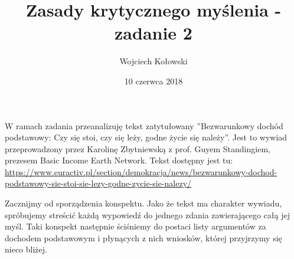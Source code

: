 \documentclass[11pt]{article}
\title{Zasady krytycznego myślenia - zadanie 2}
\author{Wojciech Kołowski}
\date{10 czerwca 2018}
\begin{document}
	\maketitle
	
	\par W ramach zadania przeanalizuję tekst zatytułowany ''Bezwarunkowy dochód podstawowy: Czy się stoi, czy się leży, godne życie się należy''. Jest to wywiad przeprowadzony przez Karolinę Zbytniewską z prof. Guyem Standingiem, prezesem Basic Income Earth Network. Tekst dostępny jest tu:
	\url{https://www.euractiv.pl/section/demokracja/news/bezwarunkowy-dochod-podstawowy-sie-stoi-sie-lezy-godne-zycie-sie-nalezy/} \\
	
	\par Zacznijmy od sporządzenia konspektu. Jako że tekst ma charakter wywiadu, spróbujemy streścić każdą wypowiedź do jednego zdania zawierającego całą jej myśl. Taki konspekt następnie ściśniemy do postaci listy argumentów za dochodem podstawowym i płynących z nich wniosków, której przyjrzymy się nieco bliżej. \\
	
\end{document}
